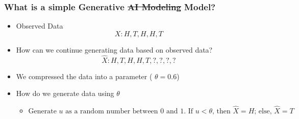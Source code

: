 \documentclass[5pt,aspectratio=169]{beamer}
\begin{document}
\begin{frame}
\frametitle{%
        \texorpdfstring{What is a simple Generative \sout{AI Modeling} Model?}{Generative Modeling}%
  }

\begin{itemize}
\item<1-> Observed Data
\[
X: H, T, H, H, T
\]
\item<1-> How can we continue generating data based on observed data?
\[
\hat{X}: H, T, H, H, T, ?, ?, ?, ?
\]
\item<1-> We compressed the data into a parameter (  $\theta = 0.6 $)
\item<2-> How do we generate data using $\theta$ 
\begin{itemize}
\item<3->$\text{Generate } u \text{ as a random number between } 0  \text{ and } 1 \text{. If } u<\theta \text{, then }\hat{X}=H\text{; else, }\hat{X}=T$
\end{itemize}
\end{itemize}
\end{frame}

    
    
\end{document}
